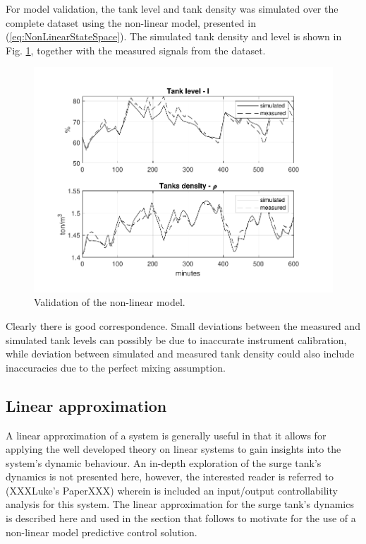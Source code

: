 \documentclass[preprint,authoryear,12pt]{elsarticle}
\begin{document}
For model validation, the tank level and tank density was simulated over the complete dataset using the non-linear model, presented in (\ref{eq:NonLinearStateSpace}). The simulated tank density and level is shown in Fig. \ref{fig:ModelValidationNL}, together with the measured signals from the dataset.
\begin{figure}[t!]
	\centering
	\includegraphics[trim={0.8cm, 0.8cm, 0.8cm, 0.8cm}, clip, width=\textwidth]{model_validation_nl.pdf}
	\caption{Validation of the non-linear model.}
	\label{fig:ModelValidationNL}
\end{figure}

Clearly there is good correspondence. Small deviations between the measured and simulated tank levels can possibly be due to inaccurate instrument calibration, while deviation between simulated and measured tank density could also include inaccuracies due to the perfect mixing assumption.

\subsection{Linear approximation}
A linear approximation of a system is generally useful in that it allows for applying the well developed theory on linear systems \citep{Skogestad2005} to gain insights into the system's dynamic behaviour. An in-depth exploration of the surge tank's dynamics is not presented here, however, the interested reader is referred to (XXXLuke's PaperXXX) wherein is included an input/output controllability analysis for this system. The linear approximation for the surge tank's dynamics is described here and used in the section that follows to motivate for the use of a non-linear model predictive control solution. 
\end{document}
